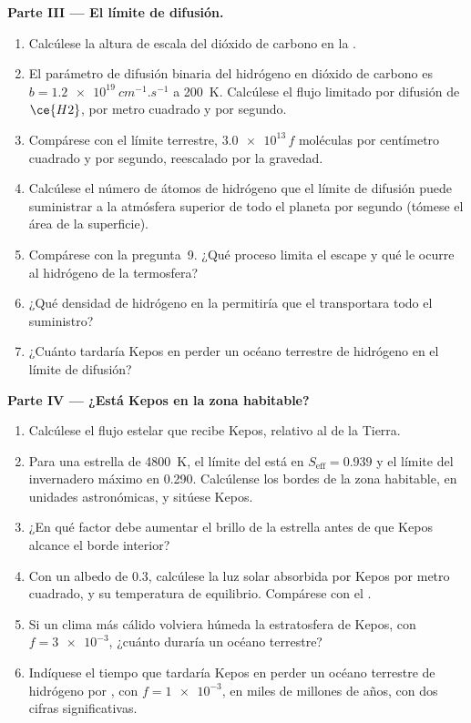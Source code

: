 \begin{problem}
\medskip\noindent\textbf{Parte III --- El límite de difusión.}
\begin{enumerate}[resume]
\item Calcúlese la altura de escala del dióxido de carbono en la .
\item El parámetro de difusión binaria del hidrógeno en dióxido de carbono es
  $b = \qty{1.2e19}{cm^{-1}.s^{-1}}$ a \qty{200}{K}. Calcúlese el
  flujo limitado por difusión de $\ce{H2}$, por metro cuadrado y por segundo.
\item Compárese con el límite terrestre, $\num{3.0e13}\,f$ moléculas por
  centímetro cuadrado y por segundo, reescalado por la gravedad.
\item Calcúlese el número de átomos de hidrógeno que el límite de difusión puede
  suministrar a la atmósfera superior de todo el planeta por segundo (tómese el
  área de la superficie).
\item Compárese con la pregunta~9. ¿Qué proceso limita el escape y qué
  le ocurre al hidrógeno de la termosfera?
\item ¿Qué densidad de hidrógeno en la  permitiría que el  transportara
  todo el suministro?
\item ¿Cuánto tardaría Kepos en perder un océano terrestre de hidrógeno en el
  límite de difusión?
\end{enumerate}

\medskip\noindent\textbf{Parte IV --- ¿Está Kepos en la zona habitable?}
\begin{enumerate}[resume]
\item Calcúlese el flujo estelar que recibe Kepos, relativo al de la Tierra.
\item Para una estrella de \qty{4800}{K}, el límite del  está en
  $S_\mathrm{eff} = 0.939$ y el límite del invernadero máximo en 0.290. Calcúlense los
  bordes de la zona habitable, en unidades astronómicas, y sitúese Kepos.
\item ¿En qué factor debe aumentar el brillo de la estrella antes de que Kepos alcance el
  borde interior?
\item Con un albedo de 0.3, calcúlese la luz solar absorbida por Kepos por
  metro cuadrado, y su temperatura de equilibrio. Compárese con el .
\item Si un clima más cálido volviera húmeda la estratosfera de Kepos, con
  $f = \num{3e-3}$, ¿cuánto duraría un océano terrestre?
\item Indíquese el tiempo que tardaría Kepos en perder un océano terrestre de hidrógeno por
  , con $f = \num{1e-3}$, en miles de millones de años,
  con dos cifras significativas.
\end{enumerate}
\end{problem}
